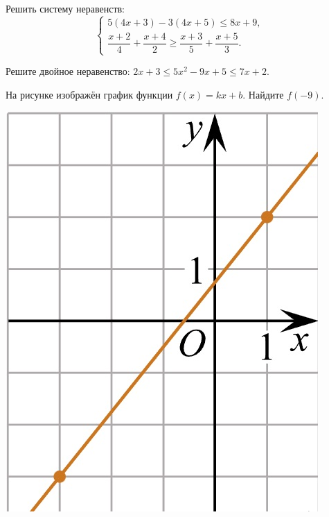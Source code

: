\begin{class}[number=6]
	\begin{listofex}
		\item Решить систему неравенств:
		\[ \left\{
		\begin{array}{l}
			5(4x+3)-3(4x+5)\le8x+9,\\
			\dfrac{x+2}{4}+\dfrac{x+4}{2}\ge\dfrac{x+3}{5}+\dfrac{x+5}{3}.
		\end{array}
		\right. \]
		\item Решите двойное неравенство: \( 2x+3\le5x^2-9x+5\le7x+2 \).
		\item
		\begin{minipage}[t]{\bodywidth}
			На рисунке изображён график функции \(f(x)=kx+b\). Найдите \(f(-9)\).
		\end{minipage}
		\hspace{0.02\linewidth}
		\begin{minipage}[t]{\picwidth}
			\includegraphics[align=t, width=\textwidth]{pics/G101M4C4-1.jpg}
		\end{minipage}

\end{listofex}
\end{class}
